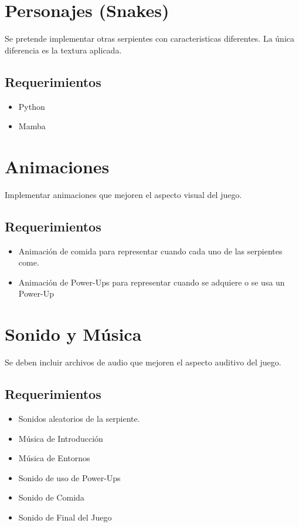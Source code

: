 \documentclass[letterpaper]{scrreprt}
\begin{document}

\section{Personajes (Snakes)}
Se pretende implementar otras serpientes con caracteristicas diferentes. La única diferencia es la textura aplicada.
\subsection{Requerimientos}
\begin{itemize}
	\item Python
	\item Mamba
\end{itemize}



\section{Animaciones}
Implementar animaciones que mejoren el aspecto visual del juego.
\subsection{Requerimientos}
\begin{itemize}
	\item Animación de comida para representar cuando cada uno de las serpientes come.
	\item Animación de Power-Ups para representar cuando se adquiere o se usa un Power-Up
\end{itemize}


\section{Sonido y Música}
Se deben incluir archivos de audio que mejoren el aspecto auditivo del juego.
\subsection{Requerimientos}
\begin{itemize}
	\item Sonidos aleatorios de la serpiente.
	\item Música de Introducción
	\item Música de Entornos
	\item Sonido de uso de Power-Ups
	\item Sonido de Comida
	\item Sonido de Final del Juego
\end{itemize}
\end{document}
